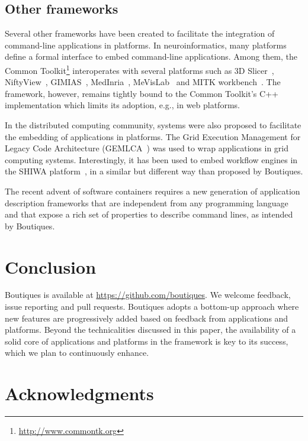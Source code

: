 \documentclass[a4paper,num-refs]{oup-contemporary}
\newcommand{\boutiques}{Boutiques\xspace}
\begin{document}
\subsection{Other frameworks}

Several other frameworks have been created to facilitate the
integration of command-line applications in platforms. In
neuroinformatics, many platforms define a formal interface to embed
command-line applications. Among them, the Common
Toolkit\footnote{\url{http://www.commontk.org}} interoperates with
several platforms such as 3D Slicer~\cite{pieper20043d},
NiftyView~\cite{Craddock2016}, GIMIAS~\cite{larrabide2009gimias},
MedInria~\cite{larrabide2009gimias}, MeVisLab~\cite{heckel2009object}
and MITK workbench~\cite{nolden2013medical}. The framework, however,
remains tightly bound to the Common Toolkit's C++ implementation which
limits its adoption, e.g., in web platforms.

In the distributed computing community, systems were also proposed to
facilitate the embedding of applications in platforms. The Grid
Execution Management for Legacy Code Architecture
(GEMLCA~\cite{delaitre2005gemlca}) was used to wrap applications in
grid computing systems. Interestingly, it has been used to embed
workflow engines in the SHIWA
platform~\cite{terstyanszky2014enabling}, in a similar but different
way than proposed by \boutiques.

The recent advent of software containers requires a new generation of
application description frameworks that are independent from any
programming language and that expose a rich set of properties to
describe command lines, as intended by \boutiques.

\section{Conclusion}

\boutiques is available at \url{https://github.com/boutiques}. We
welcome feedback, issue reporting and pull requests. \boutiques adopts
a bottom-up approach where new features are progressively added based
on feedback from applications and platforms. Beyond the technicalities
discussed in this paper, the availability of a solid core of
applications and platforms in the framework is key to its success,
which we plan to continuously enhance.

\section{Acknowledgments}
\end{document}
